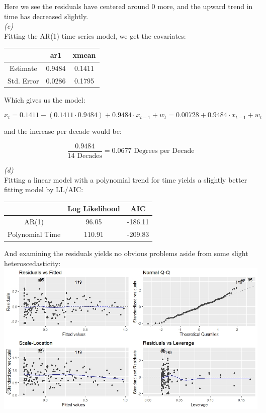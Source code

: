\documentclass[11pt,a4paper]{article}
\begin{document}
Here we see the residuals have centered around 0 more, and the upward trend in time has decreased slightly.\\

\textit{(c)}\\

Fitting the AR(1) time series model, we get the covariates:

\begin{table}[ht]
\centering
\begin{tabular}{c|c|c|}
\cline{2-3}
                                 & ar1    & xmean  \\ \hline
\multicolumn{1}{|c|}{Estimate}   & 0.9484 & 0.1411 \\ \hline
\multicolumn{1}{|c|}{Std. Error} & 0.0286 & 0.1795 \\ \hline
\end{tabular}
\end{table}

Which gives us the model:

$$ x_t = 0.1411 - ( 0.1411 \cdot 0.9484) + 0.9484 \cdot x_{t-1} + w_t = 0.00728 + 0.9484 \cdot x_{t-1} + w_t $$

and the increase per decade would be:

$$ \dfrac{0.9484}{\mbox{14 Decades} } = 0.0677 \mbox{ Degrees per Decade} $$

\textit{(d)}\\

Fitting a linear model with a polynomial trend for time yields a slightly better fitting model by LL/AIC:

\begin{table}[ht]
\centering
\begin{tabular}{c|c|c|}
\cline{2-3}
                                      & Log Likelihood & AIC     \\ \hline
\multicolumn{1}{|c|}{AR(1)}           & 96.05          & -186.11 \\ \hline
\multicolumn{1}{|c|}{Polynomial Time} & 110.91         & -209.83 \\ \hline
\end{tabular}
\end{table}

And examining the residuals yields no obvious problems aside from some slight heteroscedasticity:\\

\includegraphics[width=\textwidth]{poly_resid_4d.jpeg}
\end{document}
